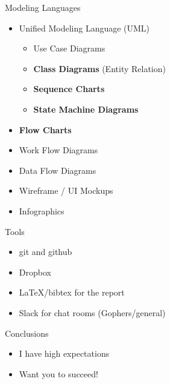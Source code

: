\documentclass[hyperref={pdfpagelabels=false}, aspectratio=1610]{beamer}
\begin{document}
\begin{frame}
\begin{block}{Modeling Languages}
 \begin{itemize}
  \item Unified Modeling Language (UML)
  \begin{itemize}
	\item Use Case Diagrams
  	\item \textbf{Class Diagrams} (Entity Relation)
	\item \textbf{Sequence Charts}
	\item \textbf{State Machine Diagrams}
  \end{itemize}
  \item \textbf{Flow Charts}
  \item Work Flow Diagrams
  \item Data Flow Diagrams
  \item Wireframe / UI Mockups
  \item Infographics
 \end{itemize}
\end{block}
\end{frame}


\begin{frame}
\begin{block}{Tools}
 \begin{itemize}
  \item git and github
  \item Dropbox
  \item LaTeX/bibtex for the report
  \item Slack for chat rooms (Gophers/general)
 \end{itemize}
\end{block}
\end{frame}


\begin{frame}
\begin{block}{Conclusions}
 \begin{itemize}
  \item I have high expectations
  \item Want you to succeed!
 \end{itemize}
\end{block}
\end{frame}
\end{document}
